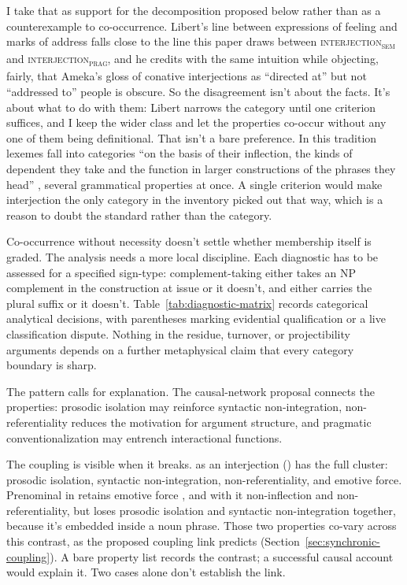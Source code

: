 \documentclass[12pt]{article}
\newcommand{\intj}[1]{\textsc{interjection\textsubscript{#1}}}
\begin{document}
I take that as support for the decomposition proposed below rather than as a
counterexample to co-occurrence. Libert's line between expressions of
feeling and marks of address falls close to the line this paper draws
between \intj{sem} and
\intj{prag}, and he credits
\textcite[109]{ameka1992} with the same intuition while objecting, fairly,
that Ameka's gloss of conative interjections as \enquote{directed at} but
not \enquote{addressed to} people is obscure. So the disagreement isn't
about the facts. It's about what to do with them: Libert narrows the
category until one criterion suffices, and I keep the wider class and let
the properties co-occur without any one of them being definitional.
That isn't a bare preference. In this tradition lexemes fall into categories
\enquote{on the basis of their inflection, the kinds of dependent they take
and the function in larger constructions of the phrases they head}
\citep[30]{HuddlestonPullum2002}, several grammatical properties at once. A
single criterion would make interjection
the only category in the inventory picked out that way, which is a reason to
doubt the standard rather than the category.

Co-occurrence without necessity doesn't settle whether membership itself is
graded. The analysis needs a more local discipline. Each diagnostic has to be
assessed for a specified sign-type: complement-taking  either
takes an NP complement in the construction at issue or it doesn't, and
 either carries the plural suffix or it doesn't.
Table~\ref{tab:diagnostic-matrix} records categorical analytical
decisions, with parentheses marking evidential qualification or a live
classification dispute. Nothing in the residue, turnover, or projectibility
arguments depends on a further metaphysical claim that every category
boundary is sharp.

The pattern calls for explanation. The causal-network proposal connects the
properties: prosodic isolation may reinforce syntactic non-integration,
non-referentiality reduces the motivation for argument structure, and
pragmatic conventionalization may entrench interactional functions.

The coupling is visible when it breaks.  as an interjection
() has the full cluster: prosodic isolation, syntactic
non-integration, non-referentiality, and emotive force. Prenominal
 in  retains emotive force
\citep[cf.][171, 182]{potts2007}, and with it non-inflection and
non-referentiality, but loses prosodic isolation and syntactic
non-integration together, because it's embedded inside a noun phrase. Those two properties co-vary across this
contrast, as the proposed coupling link predicts
(Section~\ref{sec:synchronic-coupling}). A bare property list records the
contrast; a successful causal account would explain it. Two cases alone don't
establish the link.
\end{document}
